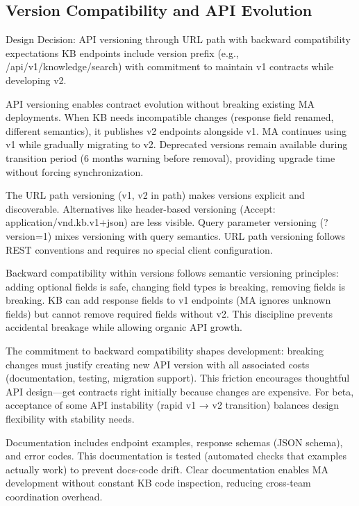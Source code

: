 \documentclass[12pt,a4paper]{article}
\begin{document}
\subsection{Version Compatibility and API Evolution}

\begin{rationale}{Design Decision: API versioning through URL path with backward compatibility expectations}
KB endpoints include version prefix (e.g., /api/v1/knowledge/search) with commitment to maintain v1 contracts while developing v2.
\end{rationale}

API versioning enables contract evolution without breaking existing MA deployments. When KB needs incompatible changes (response field renamed, different semantics), it publishes v2 endpoints alongside v1. MA continues using v1 while gradually migrating to v2. Deprecated versions remain available during transition period (6 months warning before removal), providing upgrade time without forcing synchronization.

The URL path versioning (v1, v2 in path) makes versions explicit and discoverable. Alternatives like header-based versioning (Accept: application/vnd.kb.v1+json) are less visible. Query parameter versioning (?version=1) mixes versioning with query semantics. URL path versioning follows REST conventions and requires no special client configuration.

Backward compatibility within versions follows semantic versioning principles: adding optional fields is safe, changing field types is breaking, removing fields is breaking. KB can add response fields to v1 endpoints (MA ignores unknown fields) but cannot remove required fields without v2. This discipline prevents accidental breakage while allowing organic API growth.

The commitment to backward compatibility shapes development: breaking changes must justify creating new API version with all associated costs (documentation, testing, migration support). This friction encourages thoughtful API design—get contracts right initially because changes are expensive. For beta, acceptance of some API instability (rapid v1 → v2 transition) balances design flexibility with stability needs.

Documentation includes endpoint examples, response schemas (JSON schema), and error codes. This documentation is tested (automated checks that examples actually work) to prevent docs-code drift. Clear documentation enables MA development without constant KB code inspection, reducing cross-team coordination overhead.
\end{document}
